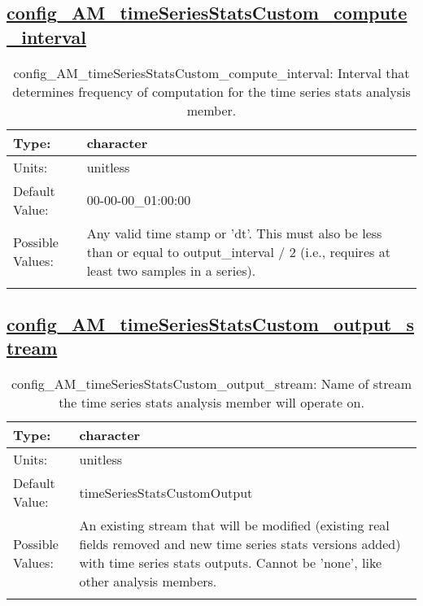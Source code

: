 \subsection[config\_AM\_timeSeriesStatsCustom\_compute\_interval]{\hyperref[sec:nm_tab_AM_timeSeriesStatsCustom]{config\_AM\_timeSeriesStatsCustom\_compute\_interval}}
\label{subsec:nm_sec_config_AM_timeSeriesStatsCustom_compute_interval}
\begin{center}
\begin{longtable}{| p{2.0in} || p{4.0in} |}
    \hline
    Type: & character \\
    \hline
    Units: & \si{unitless} \\
    \hline
    Default Value: & 00-00-00\_01:00:00 \\
    \hline
    Possible Values: & Any valid time stamp or 'dt'. This must also be less than or equal to output\_interval / 2 (i.e., requires at least two samples in a series). \\
    \hline
    \caption{config\_AM\_timeSeriesStatsCustom\_compute\_interval: Interval that determines frequency of computation for the time series stats analysis member.}
\end{longtable}
\end{center}
\subsection[config\_AM\_timeSeriesStatsCustom\_output\_stream]{\hyperref[sec:nm_tab_AM_timeSeriesStatsCustom]{config\_AM\_timeSeriesStatsCustom\_output\_stream}}
\label{subsec:nm_sec_config_AM_timeSeriesStatsCustom_output_stream}
\begin{center}
\begin{longtable}{| p{2.0in} || p{4.0in} |}
    \hline
    Type: & character \\
    \hline
    Units: & \si{unitless} \\
    \hline
    Default Value: & timeSeriesStatsCustomOutput \\
    \hline
    Possible Values: & An existing stream that will be modified (existing real fields removed and new time series stats versions added) with time series stats outputs. Cannot be 'none', like other analysis members. \\
    \hline
    \caption{config\_AM\_timeSeriesStatsCustom\_output\_stream: Name of stream the time series stats analysis member will operate on.}
\end{longtable}
\end{center}
